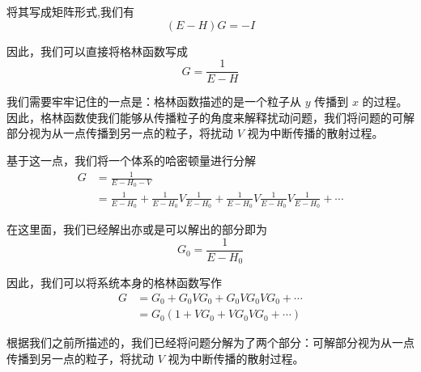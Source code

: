 \documentclass{article}
\begin{document}
将其写成矩阵形式,我们有 
\begin{equation*}
    \left(E - H\right)G = -I
\end{equation*}

因此，我们可以直接将格林函数写成
\begin{equation*}
    G = \frac{1}{E - H}
\end{equation*}

我们需要牢牢记住的一点是：格林函数描述的是一个粒子从 $y$ 传播到 $x$ 的过程。因此，格林函数使我们能够从传播粒子的角度来解释扰动问题，我们将问题的可解部分视为从一点传播到另一点的粒子，将扰动 $V$ 视为中断传播的散射过程。

基于这一点，我们将一个体系的哈密顿量进行分解
\begin{align*}
    G &= \frac{1}{E - H_0 - V} \\
    &= \frac{1}{E - H_0} + \frac{1}{E - H_0}V\frac{1}{E - H_0} + \frac{1}{E - H_0}V\frac{1}{E - H_0}V\frac{1}{E - H_0} + \cdots
\end{align*}

在这里面，我们已经解出亦或是可以解出的部分即为
\begin{equation*}
    G_0 = \frac{1}{E - H_0}
\end{equation*}

因此，我们可以将系统本身的格林函数写作
\begin{align*}
    G &= G_0 + G_0VG_0 + G_0VG_0VG_0 + \cdots\\
    &= G_0\left(1 + V G_0 + V G_0 V G_0 + \cdots\right)
\end{align*}

根据我们之前所描述的，我们已经将问题分解为了两个部分：可解部分视为从一点传播到另一点的粒子，将扰动 $V$ 视为中断传播的散射过程。
\end{document}
